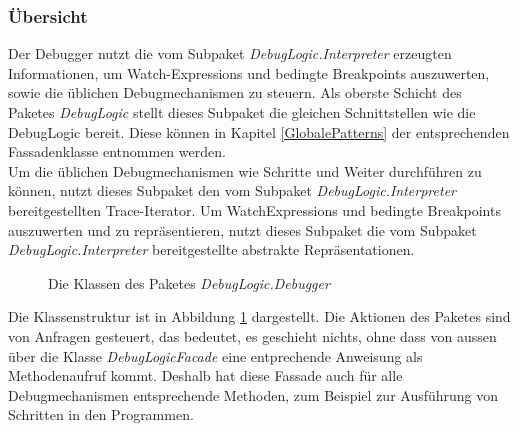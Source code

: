 \documentclass[parskip=full]{scrartcl}
\begin{document}
\subsubsection{Übersicht}
Der Debugger nutzt die vom Subpaket \textit{DebugLogic.Interpreter} erzeugten Informationen, um Watch-Expressions und bedingte Breakpoints auszuwerten, sowie die üblichen Debugmechanismen zu steuern.
Als oberste Schicht des Paketes \textit{DebugLogic} stellt dieses Subpaket die gleichen Schnittstellen wie die DebugLogic bereit. Diese können in Kapitel \ref{GlobalePatterns} der entsprechenden Fassadenklasse entnommen werden. \\
Um die üblichen Debugmechanismen wie Schritte und Weiter durchführen zu können, nutzt dieses Subpaket den vom Subpaket \textit{DebugLogic.Interpreter} bereitgestellten Trace-Iterator. 
Um WatchExpressions und bedingte Breakpoints auszuwerten und zu repräsentieren, nutzt dieses Subpaket die vom Subpaket \textit{DebugLogic.Interpreter} bereitgestellte abstrakte Repräsentationen.
\begin{figure}[!h]
\caption{Die Klassen des Paketes \textit{DebugLogic.Debugger}}
\label{fig:debuggerOverview}
\end{figure}
Die Klassenstruktur ist in Abbildung \ref{fig:debuggerOverview} dargestellt.
Die Aktionen des Paketes sind von Anfragen gesteuert, das bedeutet, es geschieht nichts, ohne dass von aussen über die Klasse \textit{DebugLogicFacade} eine entprechende Anweisung als Methodenaufruf kommt. Deshalb hat diese Fassade auch für alle Debugmechanismen entsprechende Methoden, zum Beispiel zur Ausführung von Schritten in den Programmen. \\
\end{document}
